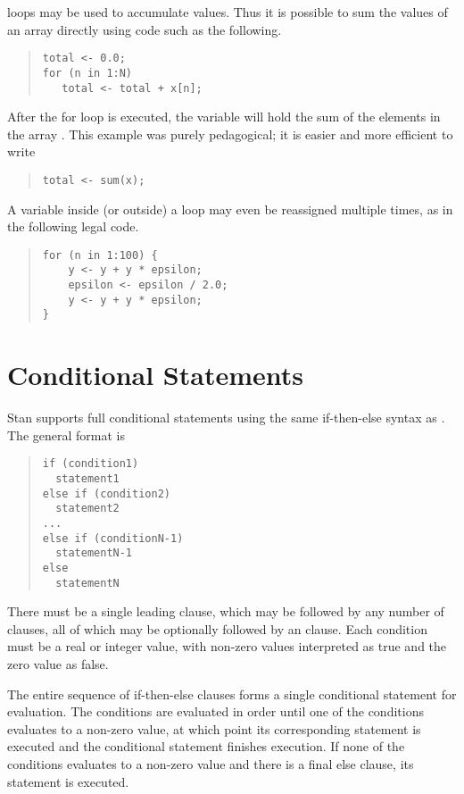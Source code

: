 \Stan loops may be used to accumulate values.  Thus it is possible to
sum the values of an array directly using code such as the
following.
%
\begin{quote}
\begin{Verbatim}[fontsize=\small]
total <- 0.0;
for (n in 1:N) 
   total <- total + x[n];
\end{Verbatim}
\end{quote}
%
After the for loop is executed, the variable  will hold
the sum of the elements in the array .  This example was
purely pedagogical; it is easier and more efficient to write
%
\begin{quote}
\begin{Verbatim}[fontsize=\small]
total <- sum(x);
\end{Verbatim}
\end{quote}

A variable inside (or outside) a loop may even be reassigned multiple
times, as in the following legal code.
%
\begin{quote}
\begin{Verbatim}[fontsize=\small]
for (n in 1:100) {
    y <- y + y * epsilon;
    epsilon <- epsilon / 2.0;
    y <- y + y * epsilon;
}
\end{Verbatim}
\end{quote}

\section{Conditional Statements}

Stan supports full conditional statements using
the same if-then-else syntax as \Cpp.  The general format is
%
\begin{quote}
\begin{Verbatim}[fontsize=\small]
if (condition1)
  statement1
else if (condition2)
  statement2
...
else if (conditionN-1)
  statementN-1
else
  statementN
\end{Verbatim}
\end{quote}
%
There must be a single leading  clause, which may be followed
by any number of  clauses, all of which may be
optionally followed by an  clause.  Each condition must be
a real or integer value, with non-zero values interpreted as true and
the zero value as false.

The entire sequence of if-then-else clauses forms a single conditional
statement for evaluation.  The conditions are evaluated in order
until one of the conditions evaluates to a non-zero value, at which
point its corresponding statement is executed and the conditional
statement finishes execution.  If none of the conditions evaluates to
a non-zero value and there is a final else clause, its statement is
executed.  


